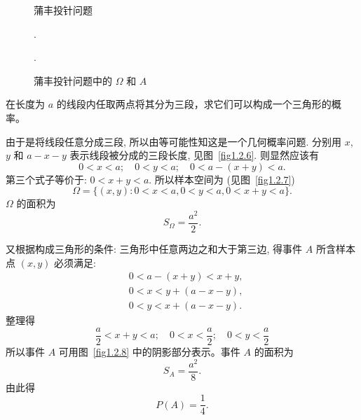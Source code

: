 \begin{figure}
    \centering
    \begin{minipage}[b]{0.5\linewidth}
        \centering
        \caption{蒲丰投针问题}.
        \label{fig1.2.4}
    \end{minipage}
    \begin{minipage}[b]{0.5\linewidth}
        \centering
        \caption{蒲丰投针问题中的 $\Omega$ 和 $A$}.
        \label{fig1.2.5}
    \end{minipage}
\end{figure}

\begin{example}
    在长度为 $a$ 的线段内任取两点将其分为三段，求它们可以构成一个三角形的概率。
\end{example}

\begin{solution}
    由于是将线段任意分成三段,
    所以由等可能性知这是一个几何概率问题.
    分别用 $x$, $y$ 和 $a - x - y$ 表示线段被分成的三段长度,
    见图~\ref{fig1.2.6}.
    则显然应该有
    \[
        0 < x < a; \quad 0 < y < a; \quad 0 < a - (x + y) < a.
    \]
    第三个式子等价于:
    $0 < x + y < a$.
    所以样本空间为 (见图~\ref{fig1.2.7})
    \[
        \Omega = \{(x, y): 0 < x < a, 0 < y < a, 0 < x + y < a\}.
    \]
    $\Omega$ 的面积为
    \[
        S _\Omega = \frac{a^2}{2}.
    \]

    又根据构成三角形的条件:
    三角形中任意两边之和大于第三边,
    得事件 $A$ 所含样本点 $(x,y)$ 必须满足:
    \begin{align*}
         & 0 < a - (x + y) < x + y, \\
         & 0 < x < y + (a - x - y), \\
         & 0 < y < x + (a - x - y).
    \end{align*}
    整理得
    \[ \frac{a}{2} < x + y < a;\quad 0 < x < \frac{a}{2}; \quad 0 < y < \frac{a}{2} \]
    所以事件 $A$ 可用图~\ref{fig1.2.8} 中的阴影部分表示。事件 $A$ 的面积为
    \[ S _A = \frac{a^2}{8}. \]
    由此得
    \[P (A) = \frac1{4}. \]
\end{solution}

